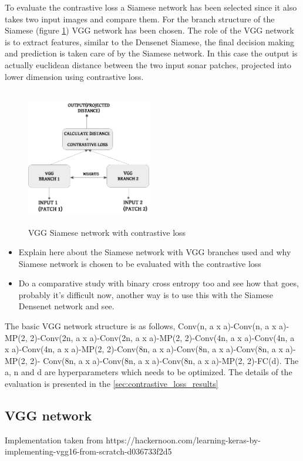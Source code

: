 To evaluate the contrastive loss a Siamese network has been selected since it also takes two input images and compare them. For the branch structure of the Siamese (figure \ref{fig:network_structure_vgg_siamese}) VGG network 
has been chosen. The role of the VGG network is to extract features, similar to the Densenet Siamese, the final decision making and prediction is taken care of by the Siamese network. In this case the output is
actually euclidean distance between the two input sonar patches, projected into lower dimension using contrastive loss.%
\newpage
\begin{figure}
\hspace{1cm}
\includegraphics[height=6cm,width=5.5cm]{images/contrastive/siamese_contrastive_loss}
\caption{VGG Siamese network with contrastive loss}
\label{fig:network_structure_vgg_siamese}
\end{figure} 
\begin{itemize}
 \item Explain here about the Siamese network with VGG branches used and why Siamese network is chosen to be evaluated with the contrastive loss
 \item Do a comparative study with binary cross entropy too and see how that goes, probably it's difficult now, another way is to use this with the Siamese Densenet network and see.
\end{itemize}

The basic VGG network structure is as follows, Conv(n, a x a)-Conv(n, a x a)-MP(2, 2)-Conv(2n, a x a)-Conv(2n, a x a)-MP(2, 2)-Conv(4n, a x a)-Conv(4n, a x a)-Conv(4n, a x a)-MP(2, 2)-Conv(8n, a x a)-Conv(8n, a x a)-Conv(8n, a x a)-MP(2, 2)-
Conv(8n, a x a)-Conv(8n, a x a)-Conv(8n, a x a)-MP(2, 2)-FC(d). The a, n and d are hyperparameters which needs to be optimized. The details of the evaluation is presented in the \autoref{sec:contrastive_loss_results}

\subsection{VGG network}
Implementation taken from https://hackernoon.com/learning-keras-by-implementing-vgg16-from-scratch-d036733f2d5